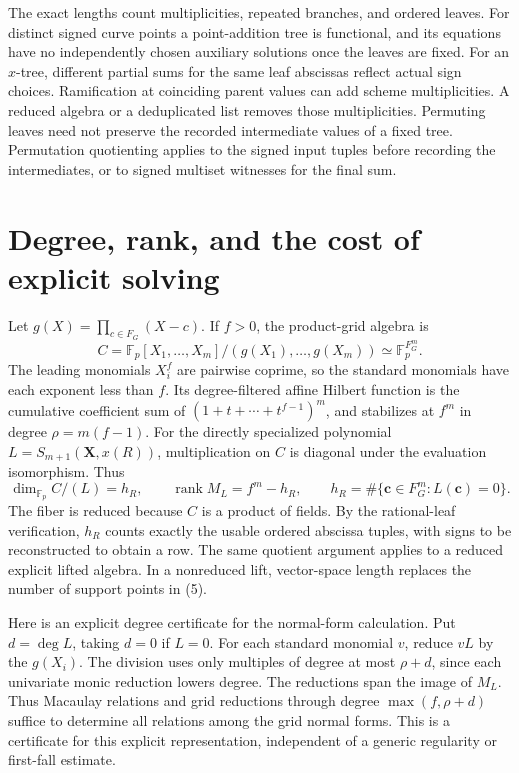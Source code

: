 \documentclass[11pt]{article}
\newcommand{\Fp}{\mathbb F_p}
\newcommand{\rank}{\operatorname{rank}}
\begin{document}
The exact lengths count multiplicities, repeated branches, and ordered leaves. For distinct signed curve points a point-addition tree is functional, and its equations have no independently chosen auxiliary solutions once the leaves are fixed. For an \(x\)-tree, different partial sums for the same leaf abscissas reflect actual sign choices. Ramification at coinciding parent values can add scheme multiplicities. A reduced algebra or a deduplicated list removes those multiplicities. Permuting leaves need not preserve the recorded intermediate values of a fixed tree. Permutation quotienting applies to the signed input tuples before recording the intermediates, or to signed multiset witnesses for the final sum.

\section{Degree, rank, and the cost of explicit solving}

Let \(g(X)=\prod_{c\in F_G}(X-c)\). If \(f>0\), the product-grid algebra is
\[
C=\Fp[X_1,\ldots,X_m]/(g(X_1),\ldots,g(X_m))\simeq \Fp^{F_G^m}.
\]
The leading monomials \(X_i^f\) are pairwise coprime, so the standard monomials have each exponent less than \(f\). Its degree-filtered affine Hilbert function is the cumulative coefficient sum of \((1+t+\cdots+t^{f-1})^m\), and stabilizes at \(f^m\) in degree \(\rho=m(f-1)\). For the directly specialized polynomial \(L=S_{m+1}(\boldsymbol X,x(R))\), multiplication on \(C\) is diagonal under the evaluation isomorphism. Thus
\[
\dim_{\Fp} C/(L)=h_R,\qquad
\rank M_L=f^m-h_R,\qquad
h_R=\#\{\boldsymbol c\in F_G^m:L(\boldsymbol c)=0\}.
\tag{5}
\]
The fiber is reduced because \(C\) is a product of fields. By the rational-leaf verification, \(h_R\) counts exactly the usable ordered abscissa tuples, with signs to be reconstructed to obtain a row. The same quotient argument applies to a reduced explicit lifted algebra. In a nonreduced lift, vector-space length replaces the number of support points in (5).

Here is an explicit degree certificate for the normal-form calculation. Put \(d=\deg L\), taking \(d=0\) if \(L=0\). For each standard monomial \(v\), reduce \(vL\) by the \(g(X_i)\). The division uses only multiples of degree at most \(\rho+d\), since each univariate monic reduction lowers degree. The reductions span the image of \(M_L\). Thus Macaulay relations and grid reductions through degree \(\max(f,\rho+d)\) suffice to determine all relations among the grid normal forms. This is a certificate for this explicit representation, independent of a generic regularity or first-fall estimate.
\end{document}
